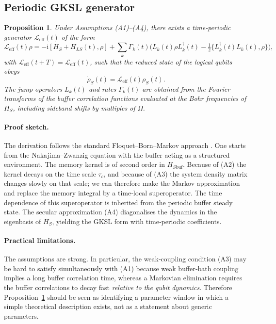 \documentclass[11pt,a4paper]{article}
\newtheorem{proposition}{Proposition}[section]
\theoremstyle{definition}
\theoremstyle{remark}
\newcommand{\ii}{\mathrm{i}}
\begin{document}
\subsection{Periodic GKSL generator}
\begin{proposition}\label{prop:periodic}
Under Assumptions (A1)–(A4), there exists a time‑periodic generator $\mathcal{L}_{\text{eff}}(t)$ of the form
\begin{equation}
\mathcal{L}_{\text{eff}}(t)\rho = -\ii[H_S + H_{LS}(t), \rho] + \sum_k \Gamma_k(t) \Big( L_k(t) \rho L_k^\dagger(t) - \tfrac12\{ L_k^\dagger(t)L_k(t),\rho \} \Big),
\end{equation}
with $\mathcal{L}_{\text{eff}}(t+T)=\mathcal{L}_{\text{eff}}(t)$, such that the reduced state of the logical qubits obeys
\begin{equation}\label{eq:periodic_dyn}
\dot\rho_S(t) = \mathcal{L}_{\text{eff}}(t)\rho_S(t).
\end{equation}
The jump operators $L_k(t)$ and rates $\Gamma_k(t)$ are obtained from the Fourier transforms of the buffer correlation functions evaluated at the Bohr frequencies of $H_S$, including sideband shifts by multiples of $\Omega$.
\end{proposition}

\paragraph{Proof sketch.}
The derivation follows the standard Floquet–Born–Markov approach \cite{Kurizki2015}. One starts from the Nakajima–Zwanzig equation with the buffer acting as a structured environment. The memory kernel is of second order in $H_{S\text{buf}}$. Because of (A2) the kernel decays on the time scale $\tau_c$, and because of (A3) the system density matrix changes slowly on that scale; we can therefore make the Markov approximation and replace the memory integral by a time‑local superoperator. The time dependence of this superoperator is inherited from the periodic buffer steady state. The secular approximation (A4) diagonalises the dynamics in the eigenbasis of $H_S$, yielding the GKSL form with time‑periodic coefficients.

\paragraph{Practical limitations.}
The assumptions are strong. In particular, the weak‑coupling condition (A3) may be hard to satisfy simultaneously with (A1) because weak buffer‑bath coupling implies a long buffer correlation time, whereas a Markovian elimination requires the buffer correlations to decay fast \emph{relative to the qubit dynamics}. Therefore Proposition~\ref{prop:periodic} should be seen as identifying a parameter window in which a simple theoretical description exists, not as a statement about generic parameters.
\end{document}
